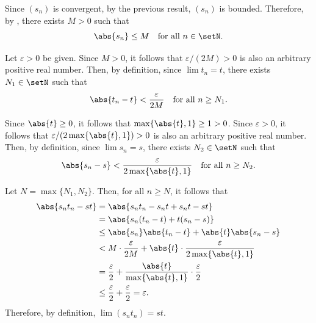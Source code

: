 \begin{enumerate}
\begin{subprove}
    Since \((s_n)\) is convergent, by the previous result, \((s_n)\) is bounded.
    Therefore, by , there exists \(M > 0\) such that
    \[
      \abs{s_n} \leq M \quad\text{for all } n \in \setN.
    \]
    
    Let \(\varepsilon > 0\) be given. Since \(M > 0\), it follows that \(\varepsilon / (2M) > 0\) 
    is also an arbitrary positive real number.
    Then, by definition, since \(\lim t_n = t\),
    there exists \(N_1 \in \setN\) such that
    \[
      \abs{t_n - t} < \frac{\varepsilon}{2M} \quad\text{for all } n \geq N_1.
    \]
    
    Since \(\abs{t} \geq 0\), it follows that \(\max\{\abs{t}, 1\} \geq 1 > 0\).
    Since \(\varepsilon > 0\), it follows that \(\varepsilon / (2\max\{\abs{t}, 1\}) > 0\) 
    is also an arbitrary positive real number.
    Then, by definition, since \(\lim s_n = s\),
    there exists \(N_2 \in \setN\) such that
    \[
      \abs{s_n - s} < \frac{\varepsilon}{2\max\{\abs{t}, 1\}} \quad\text{for all } n \geq N_2.
    \]
    
    Let \(N = \max\{N_1, N_2\}\). Then, for all \(n \geq N\), it follows that
    \begin{align*}
      \abs{s_n t_n - s t} &= \abs{s_n t_n - s_n t + s_n t - s t} \\
      &= \abs{s_n(t_n - t) + t(s_n - s)} \\
      &\leq \abs{s_n}\abs{t_n - t} + \abs{t}\abs{s_n - s} \\
      &< M \cdot \frac{\varepsilon}{2M} + \abs{t} \cdot \frac{\varepsilon}{2\max\{\abs{t}, 1\}} \\
      &= \frac{\varepsilon}{2} + \frac{\abs{t}}{\max\{\abs{t}, 1\}} \cdot \frac{\varepsilon}{2} \\
      &\leq \frac{\varepsilon}{2} + \frac{\varepsilon}{2} = \varepsilon.
    \end{align*}
    Therefore, by definition, \(\lim (s_n t_n) = s t\).
  \end{subprove}

\end{enumerate}
